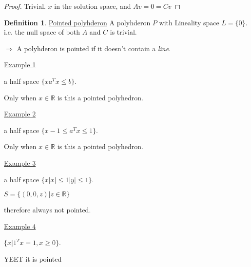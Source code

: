 \documentclass[psamsfonts, 12pt]{amsart}
\theoremstyle{definition}
\newtheorem{defn}[thm]{Definition}
\theoremstyle{remark}
\newcommand{\R}{\mathbb{R}}
\begin{document}
\begin{proof}
Trivial. $x$ in the solution space, and $Av = 0 = Cv$
\end{proof}

\begin{defn}
\underline{Pointed polyhderon} A polyhderon $P$ with Lineality space $ L = \{0\}$. i.e. the null space of both $A$ and $C$ is trivial.
\end{defn}

$\Rightarrow$ A polyhderon is pointed if it doesn't contain a \textit{line}.

\underline{Example 1}

a half space $\{ x  a^T x \leq b \}$.

Only when $x\in\R$ is this a pointed polyhedron.

\underline{Example 2}

a half space $\{ x  -1 \leq a^T x \leq 1\}$.

Only when $x\in\R$ is this a pointed polyhedron.

\underline{Example 3}

a half space $\{ x  |x|\leq 1 |y| \leq 1\}$.

$S = \{(0,0,z) | z\in\R\}$

therefore always not pointed.

\underline{Example 4}

$\{ x | 1^Tx = 1, x\geq 0\}$.

YEET it is pointed
\end{document}
